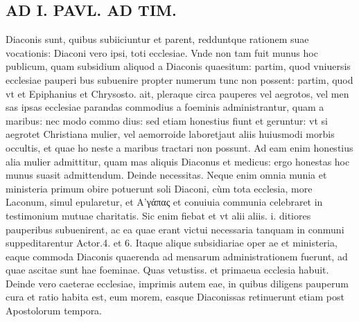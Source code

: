 \documentclass{article}
\begin{document}
\begin{pages}
\section*{AD I. PAVL. AD TIM. }
\marginpar{[ p.272 ]}\pstart Diaconis sunt, quibus subiiciuntur et parent, redduntque rationem suae vocationis: Diaconi vero ipsi, toti ecclesiae. Vnde non tam fuit munus hoc publicum, quam subsidium aliquod a Diaconis quaesitum: partim, quod vniuersis ecclesiae pauperi bus subuenire propter numerum tunc non possent: partim, quod vt et Epiphanius et Chrysosto. ait, pleraque circa pauperes vel aegrotos, vel men sas ipsas ecclesiae parandas commodius a foeminis administrantur, quam a maribus: nec modo commo dius: sed etiam honestius fiunt et geruntur: vt si aegrotet Christiana mulier, vel aemorroide laboretjaut aliis huiusmodi morbis occultis, et quae ho neste a maribus tractari non possunt. Ad eam enim honestius alia mulier admittitur, quam mas aliquis Diaconus et medicus: ergo honestas hoc munus suasit admittendum.  \pend\pstart Deinde necessitas. Neque enim omnia munia et ministeria primum obire potuerunt soli Diaconi, cùm tota ecclesia, more Laconum, simul epularetur, et Α’γάπας et conuiuia communia celebraret in testimonium mutuae charitatis. Sic enim fiebat et vt alii aliis. i. ditiores pauperibus subuenirent, ac ea quae erant victui necessaria tanquam in conmuni suppeditarentur Actor.4. et 6. Itaque alique subsidiariae oper ae et ministeria, eaque commoda Diaconis quaerenda ad mensarum administrationem fuerunt, ad quae ascitae sunt hae foeminae. Quas vetustiss. et primaeua ecclesia habuit. Deinde vero caeterae ecclesiae, imprimis autem eae, in quibus diligens pauperum cura et ratio habita est, eum morem, easque Diaconissas retinuerunt etiam post Apostolorum tempora.  \pend

\end{pages}
\end{document}
